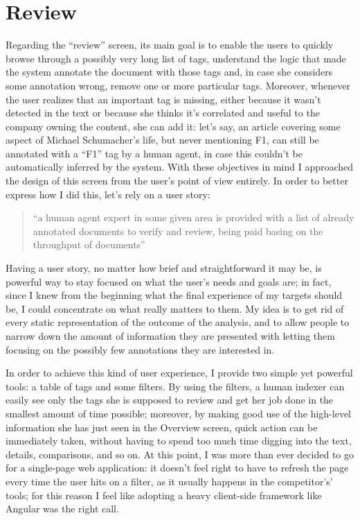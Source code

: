 \documentclass[12pt,svgnames]{memoir}
\newenvironment{quotationb}%
{\color{maincolor}\begin{leftbar}\begin{quotation}}%
{\end{quotation}\end{leftbar}\ignorespacesafterend}
\begin{document}
\section{Review}\label{review-1}

Regarding the ``review'' screen, its main goal is to enable the users to
quickly browse through a possibly very long list of tags, understand the
logic that made the system annotate the document with those tags and, in
case she considers some annotation wrong, remove one or more particular
tags. Moreover, whenever the user realizes that an important tag is
missing, either because it wasn't detected in the text or because she
thinks it's correlated and useful to the company owning the content, she
can add it: let's say, an article covering some aspect of Michael
Schumacher's life, but never mentioning F1, can still be annotated with
a ``F1'' tag by a human agent, in case this couldn't be automatically
inferred by the system. With these objectives in mind I approached the
design of this screen from the user's point of view entirely. In order
to better express how I did this, let's rely on a user story:

\begin{quotationb}
``a human agent expert in some given area is provided with a list of
already annotated documents to verify and review, being paid basing on
the throughput of documents''
\end{quotationb}

Having a user story, no matter how brief and straightforward it may be,
is powerful way to stay focused on what the user's needs and goals are;
in fact, since I knew from the beginning what the final experience of my
targets should be, I could concentrate on what really matters to them.
My idea is to get rid of every static representation of the outcome of
the analysis, and to allow people to narrow down the amount of
information they are presented with letting them focusing on the
possibly few annotations they are interested in.

In order to achieve this kind of user experience, I provide two simple
yet powerful tools: a table of tags and some filters. By using the
filters, a human indexer can easily see only the tags she is supposed to
review and get her job done in the smallest amount of time possible;
moreover, by making good use of the high-level information she has just
seen in the Overview screen, quick action can be immediately taken,
without having to spend too much time digging into the text, details,
comparisons, and so on. At this point, I was more than ever decided to
go for a single-page web application: it doesn't feel right to have to
refresh the page every time the user hits on a filter, as it usually
happens in the competitor's' tools; for this reason I feel like adopting
a heavy client-side framework like Angular was the right call.
\end{document}
